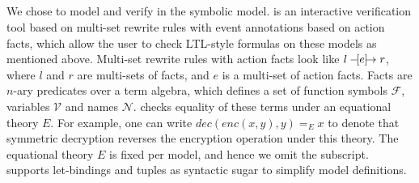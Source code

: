 { 

\subsection{\mTamarin{}}
\label{sec:tamarin}
 
We chose \mTamarin{} to model and verify \mEdhoc{} in the symbolic model.
%
\mTamarin{} is an interactive verification tool based on multi-set rewrite rules
with event annotations based on action facts, which allow the user to check
 LTL-style formulas on these models as mentioned above.
%
Multi-set rewrite rules with action facts look like $ l \ifarrow[e] r $,
where $l$ and $r$ are multi-sets of facts, and $e$ is a multi-set of action facts.
Facts are $n$-ary predicates over a term algebra, which defines a set of function
symbols $\mathcal F$, variables $\mathcal V$ and names $\mathcal N$. \mTamarin{}
checks equality of these terms under an equational theory $E$. For example,
one can write $ dec(enc(x,y),y) =_E x $
to denote that symmetric decryption reverses the encryption operation under this theory.
The equational theory $E$ is fixed per model, and hence we omit the subscript.
\mTamarin{} supports let-bindings and tuples as syntactic sugar to simplify model
definitions. \\

%

}
